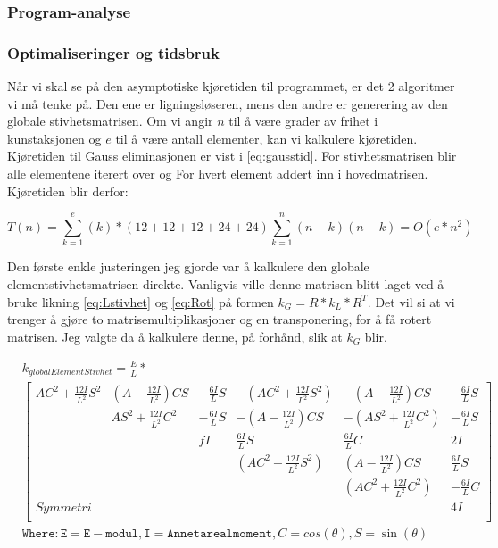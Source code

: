 \documentclass[10pt,a4paper, norsk]{article}
\begin{document}
\subsubsection{Program-analyse}

\subsubsection{Optimaliseringer og tidsbruk}
Når vi skal se på den asymptotiske kjøretiden til programmet, er det 2 algoritmer vi må tenke på. Den ene er ligningsløseren, mens den andre er generering av den globale stivhetsmatrisen. Om vi angir $n$ til å være grader av frihet i kunstaksjonen og $e$ til å være antall elementer, kan vi kalkulere kjøretiden. Kjøretiden til Gauss eliminasjonen er vist i \eqref{eq:gausstid}. For stivhetsmatrisen blir alle elementene iterert over og For hvert element addert inn i hovedmatrisen. Kjøretiden blir derfor:

\begin{equation} \label{eq:en3}
T(n) = \sum_{k=1}^{e} (k)*(12+12+12+24+24) \sum_{k=1}^{n} (n-k)(n-k) = O(e*n^2)
\end{equation}  


Den første enkle justeringen jeg gjorde var å kalkulere den globale elementstivhetsmatrisen direkte. Vanligvis ville denne matrisen blitt laget ved å bruke likning \ref{eq:Lstivhet} og \ref{eq:Rot} på formen $k_G=R*k_L*R^T$. Det vil si at vi trenger å gjøre to matrisemultiplikasjoner og en transponering, for å få rotert matrisen. Jeg valgte da å kalkulere denne, på forhånd, slik at $k_G$ blir. 

\begin{equation} 
\begin{aligned}
& k_{global Element Stivhet} = \frac{E}{L} * \\ 
&\begin{bmatrix}
AC^2+\frac{12I}{L^2} S^2  & (A-\frac{12I}{L^2})CS  &  -\frac{6I}{L}S & -(AC^2+\frac{12I}{L^2}S^2) & -(A-\frac{12I}{L^2})CS &  -\frac{6I}{L}S \\
 & AS^2 + \frac{12I}{L^2}C^2 & -\frac{6I}{L}S & -(A-\frac{12I}{L^2})CS & -(AS^2+\frac{12I}{L^2}C^2) &  -\frac{6I}{L}S \\
 & & fI &  \frac{6I}{L}S & \frac{6I}{L}C & 2I \\
 & & & (AC^2+\frac{12I}{L^2}S^2) & (A-\frac{12I}{L^2})CS & \frac{6I}{L}S\\
 & & & & (AC^2+\frac{12I}{L^2}C^2) & -\frac{6I}{L}C \\
 Symmetri & & & & & 4I \\
\end{bmatrix} \\
& \mathtt{ Where: E=E-modul, I=Annet arealmoment, } C=cos(\theta), S=\sin(\theta) \\
\end{aligned}
\end{equation}
\end{document}
